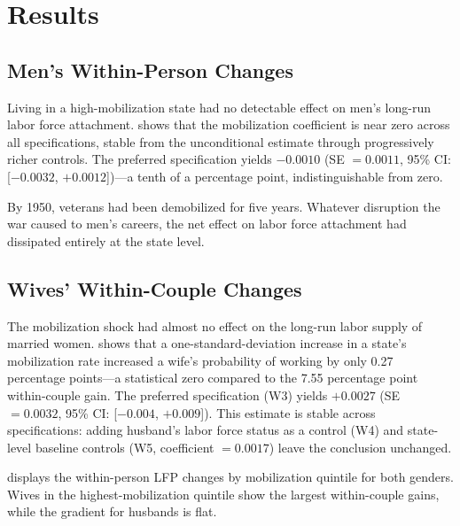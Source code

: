 \documentclass[12pt]{article}
\begin{document}

\section{Results}
\label{sec:results}

\subsection{Men's Within-Person Changes}

Living in a high-mobilization state had no detectable effect on men's long-run labor force attachment.  shows that the mobilization coefficient is near zero across all specifications, stable from the unconditional estimate through progressively richer controls. The preferred specification yields $-0.0010$ (SE $= 0.0011$, 95\% CI: [$-0.0032$, $+0.0012$])---a tenth of a percentage point, indistinguishable from zero.



By 1950, veterans had been demobilized for five years. Whatever disruption the war caused to men's careers, the net effect on labor force attachment had dissipated entirely at the state level.

\subsection{Wives' Within-Couple Changes}

The mobilization shock had almost no effect on the long-run labor supply of married women.  shows that a one-standard-deviation increase in a state's mobilization rate increased a wife's probability of working by only 0.27 percentage points---a statistical zero compared to the 7.55 percentage point within-couple gain. The preferred specification (W3) yields $+0.0027$ (SE $= 0.0032$, 95\% CI: [$-0.004$, $+0.009$]). This estimate is stable across specifications: adding husband's labor force status as a control (W4) and state-level baseline controls (W5, coefficient $= 0.0017$) leave the conclusion unchanged.



 displays the within-person LFP changes by mobilization quintile for both genders. Wives in the highest-mobilization quintile show the largest within-couple gains, while the gradient for husbands is flat.
\end{document}
